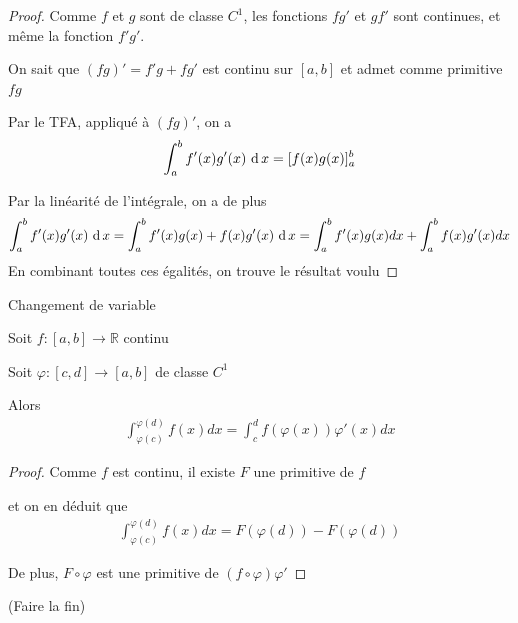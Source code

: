\begin{proof}
    Comme $f$ et $g$ sont de classe $C^1$, les fonctions $fg'$ et $gf'$ sont continues, et même la fonction $f'g'$.

    On sait que $(fg)' = f'g + fg'$ est continu sur $[a,b]$ et admet comme primitive $fg$

    Par le TFA, appliqué à $(fg)'$, on a 
    \begin{align*}
        \int_a^bf'(x)g'(x)\,\operatorname{d} x = [f(x)g(x)]_a^b
    \end{align*}

    Par la linéarité de l'intégrale, on a de plus 
    \begin{align*}
        \int_a^bf'(x)g'(x)\,\operatorname{d} x = \int_a^bf'(x)g(x) + f(x)g'(x) \,\operatorname{d} x = \int_a^b f'(x)g(x)dx + \int_a^bf(x)g'(x)dx
    \end{align*}
    En combinant toutes ces égalités, on trouve le résultat voulu
\end{proof}

\begin{theoreme}{Changement de variable}

    Soit $f : [a,b] \to \mathbb{R}$ continu

    Soit $\varphi : [c,d] \to [a,b]$ de classe $C^1$

    Alors 
    \begin{align*}
        \int_{\varphi(c)}^{\varphi(d)}f(x)dx = \int_c^df(\varphi(x))\varphi'(x)dx
    \end{align*}
\end{theoreme}

\begin{proof}

    Comme $f$ est continu, il existe $F$ une primitive de $f$

    et on en déduit que 
    \begin{align*}
        \int_{\varphi(c)}^{\varphi(d)}f(x)dx=F(\varphi(d)) - F(\varphi(d))
    \end{align*}

    De plus, $F\circ\varphi$ est une primitive de $(f\circ \varphi)\varphi'$
\end{proof}(Faire la fin)